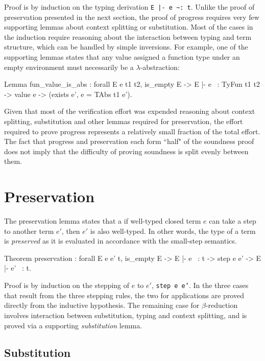 \documentclass[]{unswthesis}
\let\c\texttt
\let\i\textit
\begin{document}
Proof is by induction on the typing derivation \c{E |- e \textasciitilde: t}. Unlike the proof of preservation presented in the next section, the proof of progress requires very few supporting lemmas about context splitting or substitution. Most of the cases in the induction require reasoning about the interaction between typing and term structure, which can be handled by simple inversions. For example, one of the supporting lemmas states that any value assigned a function type under an empty environment must necessarily be a $\lambda$-abstraction:

\begin{coqcode}
Lemma fun_value_is_abs : forall E e t1 t2,
  is_empty E ->
  E |- e ~: TyFun t1 t2 ->
  value e ->
  (exists e', e = TAbs t1 e').
\end{coqcode}

Given that most of the verification effort was expended reasoning about context splitting, substitution and other lemmas required for preservation, the effort required to prove progress represents a relatively small fraction of the total effort. The fact that progress and preservation each form ``half" of the soundness proof does not imply that the difficulty of proving soundness is split evenly between them.

\section{Preservation}
\label{sec:preservation}

The preservation lemma states that a if well-typed closed term $e$ can take a step to another term $e'$, then $e'$ is also well-typed. In other words, the type of a term is \i{preserved} as it is evaluated in accordance with the small-step semantics.

\begin{coqcode}
Theorem preservation : forall E e e' t,
  is_empty E ->
  E |- e ~: t ->
  step e e' ->
  E |- e' ~: t.
\end{coqcode}

Proof is by induction on the stepping of $e$ to $e'$, \c{step e e'}. In the three cases that result from the three stepping rules, the two for applications are proved directly from the inductive hypothesis. The remaining case for $\beta$-reduction involves interaction between substitution, typing and context splitting, and is proved via a supporting \i{substitution} lemma.

\subsection{Substitution}
\label{sec:subst}
\end{document}
